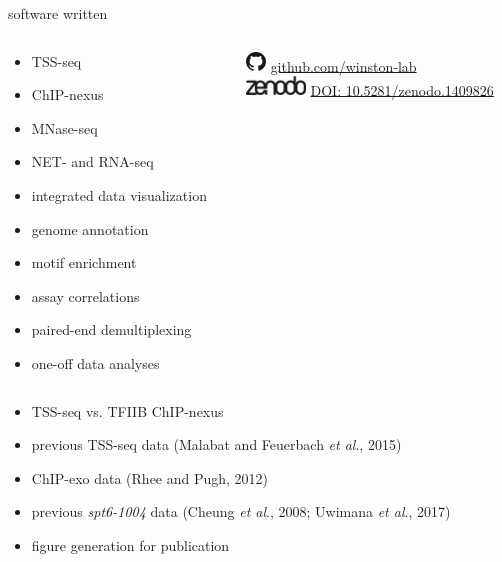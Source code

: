 \documentclass[aspectratio=169]{beamer}
\begin{document}
\begin{frame}{software written}
    \begin{columns}
        \begin{column}{0.5\textwidth}
            \begin{itemize}
                \item TSS-seq
                \item ChIP-nexus
                \item MNase-seq
                \item NET- and RNA-seq
                \item integrated data visualization
                \item genome annotation
                \item motif enrichment
                \item assay correlations
                \item paired-end demultiplexing
                \item one-off data analyses
            \end{itemize}
        \end{column}
        \begin{column}{0.5\textwidth}
            \hspace{2.7em} \includegraphics[height=1.4em]{figures/github-small.pdf} \href{https://github.com/winston-lab}{github.com/winston-lab} \\
            \vspace{1em}
            \includegraphics[height=1.4em]{figures/zenodo-black.pdf} \href{https://doi.org/10.5281/zenodo.1409826}{DOI: 10.5281/zenodo.1409826}
        \end{column}
    \end{columns}
    \begin{itemize}
        \item \small TSS-seq vs. TFIIB ChIP-nexus
        \item \small previous TSS-seq data (Malabat and Feuerbach \textit{et al}., 2015)
        \item \small ChIP-exo data (Rhee and Pugh, 2012)
        \item \small previous \textit{spt6-1004} data (Cheung \textit{et al}., 2008; Uwimana \textit{et al}., 2017)
        \item \small figure generation for publication
    \end{itemize}
\end{frame}
\end{document}
